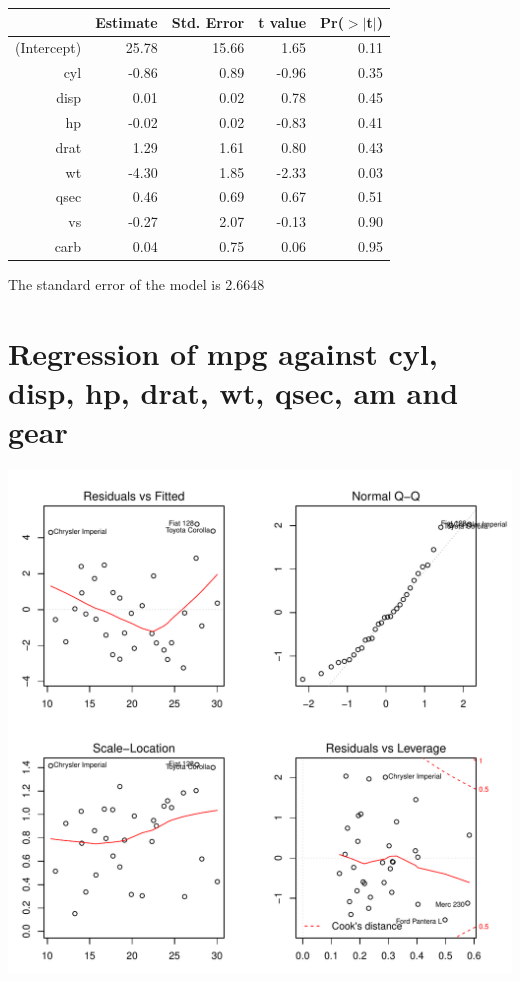 \documentclass{article}\usepackage[]{graphicx}\usepackage[]{color}
\makeatletter
\def\maxwidth{ %
  \ifdim\Gin@nat@width>\linewidth
    \linewidth
  \else
    \Gin@nat@width
  \fi
}
\newenvironment{knitrout}{}{} %
\makeatother
\begin{document}
\begin{table}[ht]
\centering
\begin{tabular}{rrrrr}
  \hline
 & Estimate & Std. Error & t value & Pr($>$$|$t$|$) \\ 
  \hline
(Intercept) & 25.78 & 15.66 & 1.65 & 0.11 \\ 
  cyl & -0.86 & 0.89 & -0.96 & 0.35 \\ 
  disp & 0.01 & 0.02 & 0.78 & 0.45 \\ 
  hp & -0.02 & 0.02 & -0.83 & 0.41 \\ 
  drat & 1.29 & 1.61 & 0.80 & 0.43 \\ 
  wt & -4.30 & 1.85 & -2.33 & 0.03 \\ 
  qsec & 0.46 & 0.69 & 0.67 & 0.51 \\ 
  vs & -0.27 & 2.07 & -0.13 & 0.90 \\ 
  carb & 0.04 & 0.75 & 0.06 & 0.95 \\ 
   \hline
\end{tabular}
\end{table}




The standard error of the model is 2.6648

\newpage

\section{Regression of mpg against cyl, disp, hp, drat, wt, qsec, am and gear }
\begin{knitrout}
\color{fgcolor}

{\centering \includegraphics[width=\maxwidth]{figure/lm-cyl-disp-hp-drat-wt-qsec-am-gear} 

}



\end{knitrout}
\end{document}
